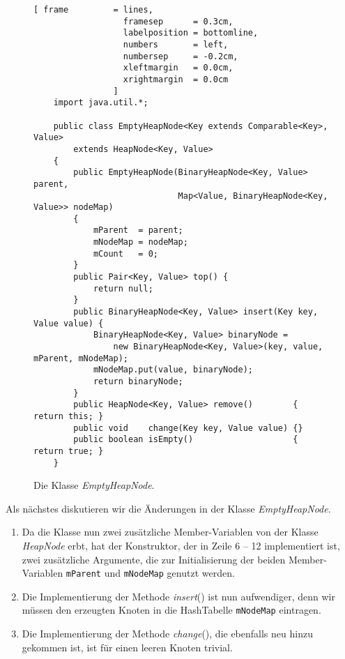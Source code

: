 \begin{figure}[!ht]
  \centering
\begin{Verbatim}[ frame         = lines, 
                  framesep      = 0.3cm, 
                  labelposition = bottomline,
                  numbers       = left,
                  numbersep     = -0.2cm,
                  xleftmargin   = 0.0cm,
                  xrightmargin  = 0.0cm
                ]
    import java.util.*;
    
    public class EmptyHeapNode<Key extends Comparable<Key>, Value> 
        extends HeapNode<Key, Value>
    {
        public EmptyHeapNode(BinaryHeapNode<Key, Value>             parent,
                             Map<Value, BinaryHeapNode<Key, Value>> nodeMap) 
        {
            mParent  = parent;
            mNodeMap = nodeMap;
            mCount   = 0;
        }    
        public Pair<Key, Value> top() {
            return null;
        }
        public BinaryHeapNode<Key, Value> insert(Key key, Value value) {
            BinaryHeapNode<Key, Value> binaryNode =
                new BinaryHeapNode<Key, Value>(key, value, mParent, mNodeMap);
            mNodeMap.put(value, binaryNode);
            return binaryNode;
        }        
        public HeapNode<Key, Value> remove()        { return this; }
        public void    change(Key key, Value value) {}
        public boolean isEmpty()                    { return true; }
    }
\end{Verbatim}
\vspace*{-0.3cm}
  \caption{Die Klasse  \textsl{EmptyHeapNode}.}
  \label{fig:EmptyHeapNode-2}
\end{figure}

Als n\"achstes diskutieren wir die Änderungen in der Klasse \textsl{EmptyHeapNode}.
\begin{enumerate}
\item Da die Klasse nun zwei zus\"atzliche Member-Variablen von der Klasse \textsl{HeapNode}
      erbt, hat der Konstruktor, der in Zeile 6 -- 12 implementiert ist, zwei zus\"atzliche
      Argumente, die zur Initialisierung der beiden Member-Variablen \texttt{mParent}
      und \texttt{mNodeMap} genutzt werden.
\item Die Implementierung der Methode \textsl{insert}() ist nun aufwendiger, denn wir
      m\"ussen den erzeugten Knoten in die HashTabelle \texttt{mNodeMap} eintragen.
\item Die Implementierung der Methode \textsl{change}(), die ebenfalls neu hinzu gekommen
      ist, ist f\"ur einen leeren Knoten trivial. 
\end{enumerate}

